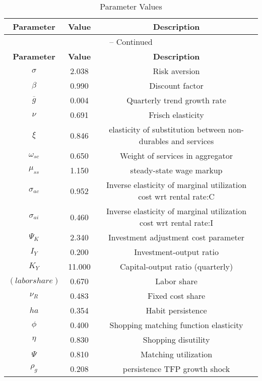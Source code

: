 \begin{center}
\begin{longtable}{ccc}
\caption{Parameter Values}\\%
\toprule%
\multicolumn{1}{c}{\textbf{Parameter}} &
\multicolumn{1}{c}{\textbf{Value}} &
 \multicolumn{1}{c}{\textbf{Description}}\\%
\midrule%
\endfirsthead
\multicolumn{3}{c}{{\tablename} \thetable{} -- Continued}\\%
\midrule%
\multicolumn{1}{c}{\textbf{Parameter}} &
\multicolumn{1}{c}{\textbf{Value}} &
  \multicolumn{1}{c}{\textbf{Description}}\\%
\midrule%
\endhead
${\sigma}$ 	 & 	 2.038 	 & 	 Risk aversion\\
${\beta}$ 	 & 	 0.990 	 & 	 Discount factor\\
${\overline{g}}$ 	 & 	 0.004 	 & 	 Quarterly trend growth rate\\
$\nu$ 	 & 	 0.691 	 & 	 Frisch elasticity\\
$\xi$ 	 & 	 0.846 	 & 	 elasticity of substitution between non-durables and services\\
$\omega_{sc}$ 	 & 	 0.650 	 & 	 Weight of services in aggregator\\
$\mu_{ss}$ 	 & 	 1.150 	 & 	 steady-state wage markup\\
${\sigma_{ac}}$ 	 & 	 0.952 	 & 	 Inverse elasticity of marginal utilization cost wrt rental rate:C\\
${\sigma_{ai}}$ 	 & 	 0.460 	 & 	 Inverse elasticity of marginal utilization cost wrt rental rate:I\\
${\Psi_{K}}$ 	 & 	 2.340 	 & 	 Investment adjustment cost parameter\\
${I_Y}$ 	 & 	 0.200 	 & 	 Investment-output ratio\\
${K_Y}$ 	 & 	 11.000 	 & 	 Capital-output ratio (quarterly)\\
$(labor share)$ 	 & 	 0.670 	 & 	 Labor share\\
${\nu_R}$ 	 & 	 0.483 	 & 	 Fixed cost share\\
${ha}$ 	 & 	 0.354 	 & 	 Habit persistence\\
${\phi}$ 	 & 	 0.400 	 & 	 Shopping matching function elasticity\\
${\eta}$ 	 & 	 0.830 	 & 	 Shopping disutility\\
${\Psi}$ 	 & 	 0.810 	 & 	 Matching utilization\\
${\rho_g}$ 	 & 	 0.208 	 & 	 persistence TFP growth shock\\

\end{longtable}
\end{center}
